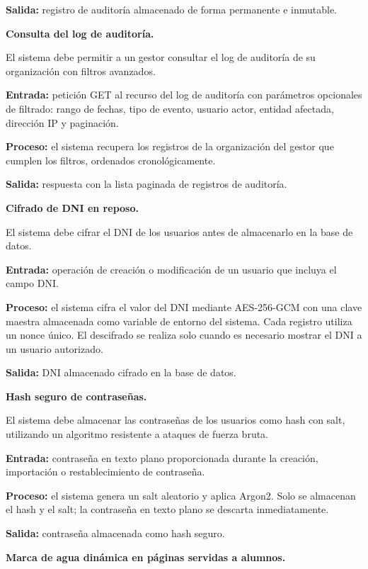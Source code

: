 \begin{functional}
\begin{functional}
    \textbf{Salida:} registro de auditoría almacenado de forma permanente e inmutable.

    \item \textbf{Consulta del log de auditoría.}

    El sistema debe permitir a un gestor consultar el log de auditoría de su organización con filtros avanzados.

    \textbf{Entrada:} petición GET al recurso del log de auditoría con parámetros opcionales de filtrado: rango de fechas, tipo de evento, usuario actor, entidad afectada, dirección IP y paginación.

    \textbf{Proceso:} el sistema recupera los registros de la organización del gestor que cumplen los filtros, ordenados cronológicamente.

    \textbf{Salida:} respuesta con la lista paginada de registros de auditoría.

    \item \textbf{Cifrado de DNI en reposo.}

    El sistema debe cifrar el DNI de los usuarios antes de almacenarlo en la base de datos.

    \textbf{Entrada:} operación de creación o modificación de un usuario que incluya el campo DNI.

    \textbf{Proceso:} el sistema cifra el valor del DNI mediante AES-256-GCM con una clave maestra almacenada como variable de entorno del sistema. Cada registro utiliza un nonce único. El descifrado se realiza solo cuando es necesario mostrar el DNI a un usuario autorizado.

    \textbf{Salida:} DNI almacenado cifrado en la base de datos.

    \item \textbf{Hash seguro de contraseñas.}

    El sistema debe almacenar las contraseñas de los usuarios como hash con salt, utilizando un algoritmo resistente a ataques de fuerza bruta.

    \textbf{Entrada:} contraseña en texto plano proporcionada durante la creación, importación o restablecimiento de contraseña.

    \textbf{Proceso:} el sistema genera un salt aleatorio y aplica Argon2. Solo se almacenan el hash y el salt; la contraseña en texto plano se descarta inmediatamente.

    \textbf{Salida:} contraseña almacenada como hash seguro.

    \item \textbf{Marca de agua dinámica en páginas servidas a alumnos.}


\end{functional}
\end{functional}
